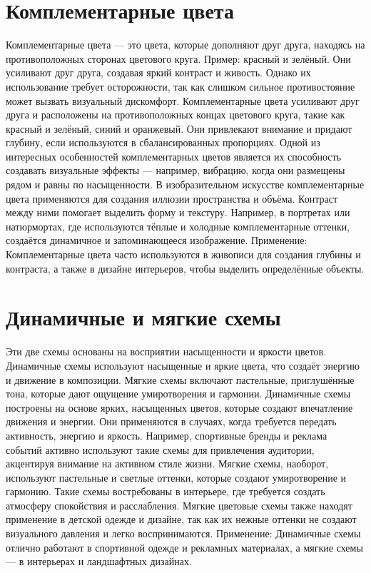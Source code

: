 \documentclass[bachelor, och, referat]{SCWorks}
\begin{document}
\section{Комплементарные цвета}
Комплементарные цвета — это цвета, которые дополняют друг друга, находясь на противоположных сторонах цветового круга. Пример: красный и зелёный. Они усиливают друг друга, создавая яркий контраст и живость. Однако их использование требует осторожности, так как слишком сильное противостояние может вызвать визуальный дискомфорт.
Комплементарные цвета усиливают друг друга и расположены на противоположных концах цветового круга, такие как красный и зелёный, синий и оранжевый. Они привлекают внимание и придают глубину, если используются в сбалансированных пропорциях. Одной из интересных особенностей комплементарных цветов является их способность создавать визуальные эффекты — например, вибрацию, когда они размещены рядом и равны по насыщенности.
В изобразительном искусстве комплементарные цвета применяются для создания иллюзии пространства и объёма. Контраст между ними помогает выделить форму и текстуру. Например, в портретах или натюрмортах, где используются тёплые и холодные комплементарные оттенки, создаётся динамичное и запоминающееся изображение.
Применение: Комплементарные цвета часто используются в живописи для создания глубины и контраста, а также в дизайне интерьеров, чтобы выделить определённые объекты.

\section{Динамичные и мягкие схемы}
Эти две схемы основаны на восприятии насыщенности и яркости цветов. Динамичные схемы используют насыщенные и яркие цвета, что создаёт энергию и движение в композиции. Мягкие схемы включают пастельные, приглушённые тона, которые дают ощущение умиротворения и гармонии.
Динамичные схемы построены на основе ярких, насыщенных цветов, которые создают впечатление движения и энергии. Они применяются в случаях, когда требуется передать активность, энергию и яркость. Например, спортивные бренды и реклама событий активно используют такие схемы для привлечения аудитории, акцентируя внимание на активном стиле жизни.
Мягкие схемы, наоборот, используют пастельные и светлые оттенки, которые создают умиротворение и гармонию. Такие схемы востребованы в интерьере, где требуется создать атмосферу спокойствия и расслабления. Мягкие цветовые схемы также находят применение в детской одежде и дизайне, так как их нежные оттенки не создают визуального давления и легко воспринимаются.
Применение: Динамичные схемы отлично работают в спортивной одежде и рекламных материалах, а мягкие схемы — в интерьерах и ландшафтных дизайнах.
\end{document}
